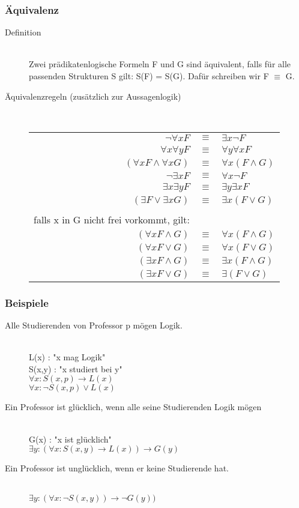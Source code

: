 \documentclass[a4paper,10pt]{article}
\newcommand{\ra}{\rightarrow}
\begin{document}
\subsubsection{\"Aquivalenz}
\begin{description}
	\item[Definition] \hfill \\
		Zwei pr\"adikatenlogische Formeln F und G sind \"aquivalent, falls f\"ur alle passenden Strukturen S gilt: S(F) = S(G). Daf\"ur schreiben wir F $\equiv$ G.
	\item[\"Aquivalenzregeln (zus\"atzlich zur Aussagenlogik)] \hfill \\
	\begin{tabular}{rcl}
		$\neg \forall x F $&$\equiv$&$ \exists x \neg F$ \\
		$\forall x \forall y F $&$\equiv$&$ \forall y \forall x F$ \\
		$(\forall x F \wedge \forall x G) $&$\equiv$&$ \forall x (F \wedge G)$ \\
		$\neg \exists x F $&$\equiv$&$ \forall x \neg F$ \\		
		$\exists x \exists y F $&$\equiv$&$ \exists y \exists x F$ \\
		$(\exists F \vee \exists x G) $&$\equiv$&$ \exists x (F \vee G)$ \\ \\
		falls x in G nicht frei vorkommt, gilt: \\
		$(\forall x F \wedge G) $&$\equiv$&$ \forall x (F \wedge G)$ \\
		$(\forall x F \vee G) $&$\equiv$&$ \forall x (F \vee G)$ \\
		$(\exists x F \wedge G) $&$\equiv$&$ \exists x (F \wedge G)$ \\
		$(\exists x F \vee G) $&$\equiv$&$ \exists (F \vee G)$ \\
	\end{tabular}
\end{description}

\subsubsection{Beispiele}
\begin{description}
	\item[Alle Studierenden von Professor p m\"ogen Logik.] \hfill \\
		L(x) : "x mag Logik" \\
		S(x,y) : "x studiert bei y" \\
		$\forall x: S(x,p) \ra L(x)$ \\
		$\forall x: \neg S(x,p) \vee L(x)$
	\item[Ein Professor ist gl\"ucklich, wenn alle seine Studierenden Logik m\"ogen] \hfill \\
		G(x) : "x ist gl\"ucklich" \\
		$\exists y: (\forall x : S(x,y) \ra L(x)) \ra G(y)$
	\item[Ein Professor ist ungl\"ucklich, wenn er keine Studierende hat.] \hfill \\
		$\exists y: (\forall x : \neg S(x,y)) \ra \neg G(y))$
\end{description}
\end{document}
